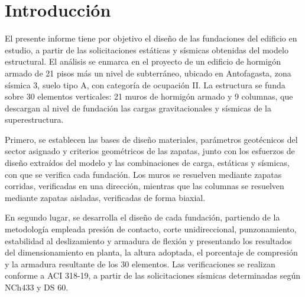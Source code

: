 \section{Introducción}
El presente informe tiene por objetivo el diseño de las fundaciones del edificio en estudio, a partir de las solicitaciones estáticas y sísmicas obtenidas del modelo estructural. El análisis se enmarca en el proyecto de un edificio de hormigón armado de 21 pisos más un nivel de subterráneo, ubicado en Antofagasta, zona sísmica 3, suelo tipo A, con categoría de ocupación II. La estructura se funda sobre 30 elementos verticales: 21 muros de hormigón armado y 9 columnas, que descargan al nivel de fundación las cargas gravitacionales y sísmicas de la superestructura.

Primero, se establecen las bases de diseño materiales, parámetros geotécnicos del sector asignado y criterios geométricos de las zapatas, junto con los esfuerzos de diseño extraídos del modelo y las combinaciones de carga, estáticas y sísmicas, con que se verifica cada fundación. Los muros se resuelven mediante zapatas corridas, verificadas en una dirección, mientras que las columnas se resuelven mediante zapatas aisladas, verificadas de forma biaxial.

En segundo lugar, se desarrolla el diseño de cada fundación, partiendo de la metodología empleada presión de contacto, corte unidireccional, punzonamiento, estabilidad al deslizamiento y armadura de flexión y presentando los resultados del dimensionamiento en planta, la altura adoptada, el porcentaje de compresión y la armadura resultante de los 30 elementos. Las verificaciones se realizan conforme a ACI 318-19, a partir de las solicitaciones sísmicas determinadas según NCh433 y DS 60.